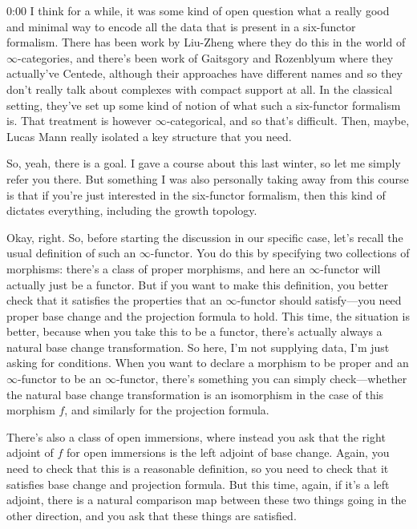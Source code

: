 \begin{unfinished}{0:00}
I think for a while, it was some kind of open question what a really good and minimal way to encode all the data that is present in a six-functor formalism. There has been work by Liu-Zheng where they do this in the world of $\infty$-categories, and there's been work of Gaitsgory and Rozenblyum where they actually've Centede, although their approaches have different names and so they don't really talk about complexes with compact support at all. In the classical setting, they've set up some kind of notion of what such a six-functor formalism is. That treatment is however $\infty$-categorical, and so that's difficult. Then, maybe, Lucas Mann really isolated a key structure that you need.

So, yeah, there is a goal. I gave a course about this last winter, so let me simply refer you there. But something I was also personally taking away from this course is that if you're just interested in the six-functor formalism, then this kind of dictates everything, including the growth topology.

Okay, right. So, before starting the discussion in our specific case, let's recall the usual definition of such an $\infty$-functor. You do this by specifying two collections of morphisms: there's a class of proper morphisms, and here an $\infty$-functor will actually just be a functor. But if you want to make this definition, you better check that it satisfies the properties that an $\infty$-functor should satisfy---you need proper base change and the projection formula to hold. This time, the situation is better, because when you take this to be a functor, there's actually always a natural base change transformation. So here, I'm not supplying data, I'm just asking for conditions. When you want to declare a morphism to be proper and an $\infty$-functor to be an $\infty$-functor, there's something you can simply check---whether the natural base change transformation is an isomorphism in the case of this morphism $f$, and similarly for the projection formula.

There's also a class of open immersions, where instead you ask that the right adjoint of $f$ for open immersions is the left adjoint of base change. Again, you need to check that this is a reasonable definition, so you need to check that it satisfies base change and projection formula. But this time, again, if it's a left adjoint, there is a natural comparison map between these two things going in the other direction, and you ask that these things are satisfied.


\end{unfinished}
